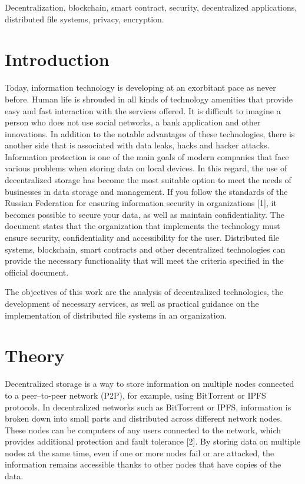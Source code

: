 \documentclass[10pt,conference,a4paper]{IEEEtran_EDM}
\begin{document}
\begin{IEEEkeywords}
Decentralization, blockchain, smart contract, security, decentralized applications, distributed file systems, privacy, encryption.
\end{IEEEkeywords}

\section{Introduction}
Today, information technology is developing at an exorbitant pace as never before. Human life is shrouded in all kinds of technology amenities that provide easy and fast interaction with the services offered. It is difficult to imagine a person who does not use social networks, a bank application and other innovations. In addition to the notable advantages of these technologies, there is another side that is associated with data leaks, hacks and hacker attacks. Information protection is one of the main goals of modern companies that face various problems when storing data on local devices. In this regard, the use of decentralized storage has become the most suitable option to meet the needs of businesses in data storage and management. If you follow the standards of the Russian Federation for ensuring information security in organizations [1], it becomes possible to secure your data, as well as maintain confidentiality. The document states that the organization that implements the technology must ensure security, confidentiality and accessibility for the user. Distributed file systems, blockchain, smart contracts and other decentralized technologies can provide the necessary functionality that will meet the criteria specified in the official document. 

The objectives of this work are the analysis of decentralized technologies, the development of necessary services, as well as practical guidance on the implementation of distributed file systems in an organization.


\section{Theory}

Decentralized storage is a way to store information on multiple nodes connected to a peer–to-peer network (P2P), for example, using BitTorrent or IPFS protocols.
In decentralized networks such as BitTorrent or IPFS, information is broken down into small parts and distributed across different network nodes. These nodes can be computers of any users connected to the network, which provides additional protection and fault tolerance [2]. By storing data on multiple nodes at the same time, even if one or more nodes fail or are attacked, the information remains accessible thanks to other nodes that have copies of the data.
\end{document}
